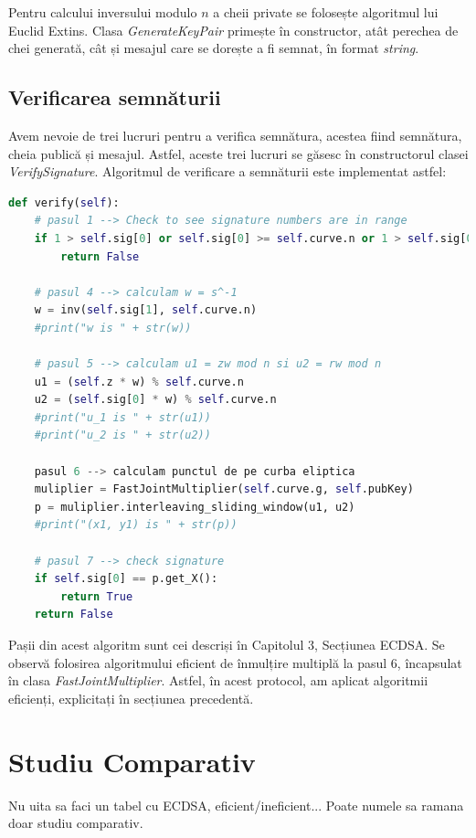Pentru calcului inversului modulo $n$ a cheii private se folosește algoritmul lui Euclid Extins. Clasa \textit{GenerateKeyPair} primește în constructor, atât perechea de chei generată, cât și mesajul care se dorește a fi semnat, în format \textit{string}.

\subsection{Verificarea semnăturii}

Avem nevoie de trei lucruri pentru a verifica semnătura, acestea fiind semnătura, cheia publică și mesajul. Astfel, aceste trei lucruri se găsesc în constructorul clasei \textit{VerifySignature}. Algoritmul de verificare a semnăturii este implementat astfel:

\begin{lstlisting}[language=Python]
def verify(self):
    # pasul 1 --> Check to see signature numbers are in range
    if 1 > self.sig[0] or self.sig[0] >= self.curve.n or 1 > self.sig[0] or self.sig[0] >= self.curve.n:
        return False

    # pasul 4 --> calculam w = s^-1
    w = inv(self.sig[1], self.curve.n)
    #print("w is " + str(w))

    # pasul 5 --> calculam u1 = zw mod n si u2 = rw mod n
    u1 = (self.z * w) % self.curve.n
    u2 = (self.sig[0] * w) % self.curve.n
    #print("u_1 is " + str(u1))
    #print("u_2 is " + str(u2))

    pasul 6 --> calculam punctul de pe curba eliptica
    muliplier = FastJointMultiplier(self.curve.g, self.pubKey)
    p = muliplier.interleaving_sliding_window(u1, u2)
    #print("(x1, y1) is " + str(p))

    # pasul 7 --> check signature
    if self.sig[0] == p.get_X():
        return True
    return False
\end{lstlisting}

Pașii din acest algoritm sunt cei descriși în Capitolul 3, Secțiunea ECDSA. Se observă folosirea algoritmului eficient de înmulțire multiplă la pasul 6, încapsulat în clasa \textit{FastJointMultiplier}. Astfel, în acest protocol, am aplicat algoritmii eficienți, explicitați în secțiunea precedentă.

\section{Studiu Comparativ}

Nu uita sa faci un tabel cu ECDSA, eficient/ineficient... Poate numele sa ramana doar studiu comparativ.

